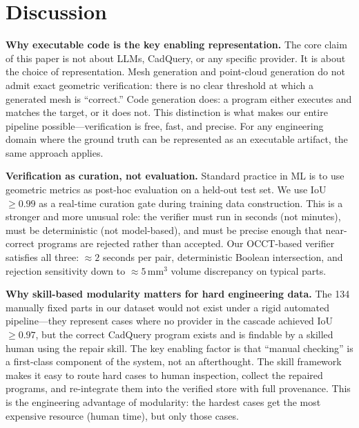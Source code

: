 \section{Discussion}
\label{sec:discussion}

\noindent\textbf{Why executable code is the key enabling representation.}
The core claim of this paper is not about LLMs, CadQuery, or any specific provider.
It is about the choice of representation.
Mesh generation and point-cloud generation do not admit exact geometric verification:
there is no clear threshold at which a generated mesh is ``correct.''
Code generation does: a program either executes and matches the target, or it does not.
This distinction is what makes our entire pipeline possible---verification is free, fast,
and precise.
For any engineering domain where the ground truth can be represented as an executable
artifact, the same approach applies.

\noindent\textbf{Verification as curation, not evaluation.}
Standard practice in ML is to use geometric metrics as post-hoc evaluation on a held-out
test set.
We use IoU~$\geq 0.99$ as a real-time curation gate during training data construction.
This is a stronger and more unusual role: the verifier must run in seconds (not minutes),
must be deterministic (not model-based), and must be precise enough that near-correct
programs are rejected rather than accepted.
Our OCCT-based verifier satisfies all three: ${\approx}2$ seconds per pair, deterministic
Boolean intersection, and rejection sensitivity down to ${\approx}5\,\text{mm}^3$ volume
discrepancy on typical parts.

\noindent\textbf{Why skill-based modularity matters for hard engineering data.}
The 134 manually fixed parts in our dataset would not exist under a rigid automated
pipeline---they represent cases where no provider in the cascade achieved
IoU~$\geq 0.97$, but the correct CadQuery program exists and is findable by a skilled
human using the repair skill.
The key enabling factor is that ``manual checking'' is a first-class component of the
system, not an afterthought.
The skill framework makes it easy to route hard cases to human inspection, collect the
repaired programs, and re-integrate them into the verified store with full provenance.
This is the engineering advantage of modularity: the hardest cases get the most expensive
resource (human time), but only those cases.

